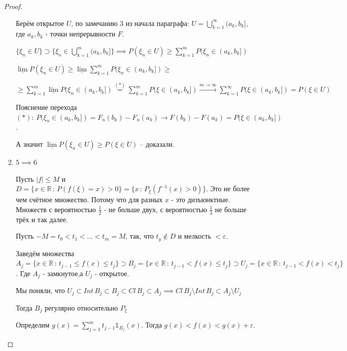 \begin{proof}
\begin{enumerate}
{            Берём открытое $U$, по замечанию 3 из начала параграфа: $U =  \bigcup\limits_{k = 1}^{\infty} (a_k, b_k]$, где $a_k, b_k$ - точки непрерывности $F$.

            $\{ \xi_n \in U \} \supset \{ \xi_n \in \bigcup\limits_{k = 1}^{m} (a_k, b_k] \} \implies P(\xi_n \in U) \geqslant \sum_{k = 1}^m P(\xi_n \in (a_k, b_k])$

            $\underline{\lim} P(\xi_n \in U) \geqslant \underline{\lim} \sum_{k = 1}^m P(\xi_n \in (a_k, b_k]) \geqslant$
            
            $\geqslant \sum_{k = 1}^m \underline{\lim} P(\xi_n \in (a_k, b_k]) \overset{(*)}{=} \sum_{k = 1}^m P(\xi \in (a_k, b_k]) \overset{m \to \infty}{\rightarrow} \sum_{k = 1}^{\infty} P(\xi \in (a_k, b_k]) = P(\xi \in U)$

            Пояснение перехода $(*): \ P(\xi_n \in (a_k, b_k]) = F_n (b_k) - F_n (a_k) \rightarrow F(b_k) - F(a_k) = P(\xi \in (a_k, b_k])$.
            
            А значит $\underline{\lim} P(\xi_n \in U) \geqslant P(\xi \in U)$ -- доказали.
        }
        \item {
            $5 \implies 6$

            Пусть $|f| \leqslant M$ и $D = \{ x \in \mathbb{R} \, : \, P(f(\xi) = x) > 0 \} = \{ x \, : \, P_{\xi} (f^{-1} (x) > 0) \}$. Это не более чем счётное множество. Потому что для разных $x$ - это дизъюнктные.
            Множеств с вероятностью $\frac{1}{2}$ - не больше двух, с вероятностью $\frac{1}{3}$ не больше трёх и так далее.

            Пусть $-M = t_0 < t_1 < \ldots < t_m = M$, так, что $t_y \not \in D$ и мелкость $< \varepsilon$.

            Заведём множества $A_j = \{ x \in \mathbb{R} \, : \, t_{j - 1} \leqslant f(x) \leqslant t_j \} \supset B_j = \{ x \in \mathbb{R} \, : \, t_{j - 1} < f(x) \leqslant t_j \} \supset U_j = \{ x \in \mathbb{R} \, : \, t_{j - 1} < f(x) < t_j \}$. Где $A_j$ - замкнутое,а $U_j$ - открытое.

            Мы поняли, что $U_j \subset Int \, B_j \subset B_j \subset Cl \, B_j \subset A_j \implies Cl \, B_j \setminus Int \, B_j \subset A_j \setminus U_j$

            Тогда $B_j$ регулярно относительно $P_\xi$

            Определим $g(x) = \sum_{j = 1}^{m} t_{j - 1} \mathds{1}_{B_j} (x)$. Тогда $g(x) < f(x) < g(x) + \varepsilon$.

}
\end{enumerate}
\end{proof}
